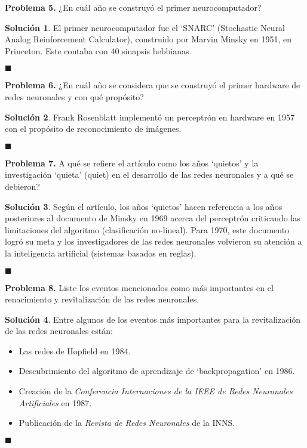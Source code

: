 \documentclass[12pt]{article}
\theoremstyle{plain}
\theoremstyle{definition}
\theoremstyle{definition}
\theoremstyle{definition}
\newtheorem*{solution}{Solución}
\begin{document}
\noindent \textbf{Problema 5.} ¿En cuál año se construyó el primer neurocomputador?
\begin{solution}
El primer neurocomputador fue el `SNARC' (Stochastic Neural Analog Reinforcement Calculator), construido por Marvin Minsky en 1951, en Princeton. Este contaba con 40 sinapsis hebbianas.
\end{solution}
\begin{flushright}
$\blacksquare$
\end{flushright}

\noindent \textbf{Problema 6.} ¿En cuál año se considera que se construyó el primer hardware de redes neuronales y con qué propósito?
\begin{solution}
Frank Rosenblatt implementó un perceptrón en hardware en 1957 con el propósito de reconocimiento de imágenes.
\end{solution}
\begin{flushright}
$\blacksquare$
\end{flushright}

\noindent \textbf{Problema 7.} A qué se refiere el artículo como los años `quietos'  y la investigación `quieta' (quiet) en el desarrollo de las redes neuronales y a qué se debieron?

\begin{solution}
Según el artículo, los años `quietos' hacen referencia a los años posteriores al documento de Minsky en 1969 acerca del perceptrón criticando las limitaciones del algoritmo (clasificación no-lineal). Para 1970, este documento logró su meta y los investigadores de las redes neuronales volvieron su atención a la inteligencia artificial (sistemas basados en reglas). 
\end{solution}
\begin{flushright}
$\blacksquare$
\end{flushright}

\noindent \textbf{Problema 8.} Liste los eventos mencionados como más importantes en el renacimiento y revitalización de las redes neuronales.

\begin{solution}
Entre algunos de los eventos más importantes para la revitalización de las redes neuronales están:
\begin{itemize}
    \item[1.] Las redes de Hopfield en 1984.
    \item[2.] Descubrimiento del algoritmo de aprendizaje de `backpropagation' en 1986.
    \item[3.] Creación de la \textit{Conferencia Internaciones de la IEEE de Redes Neuronales Artificiales} en 1987.
    \item[4.] Publicación de la \textit{Revista de Redes Neuronales} de la INNS.
\end{itemize}
\end{solution}
\begin{flushright}
$\blacksquare$
\end{flushright}
\end{document}
